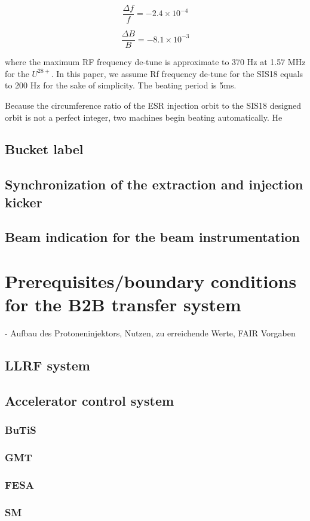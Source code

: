\begin{equation}
\frac{\Delta{f}}{f} = -{2.4}{\times}10^{-4}
\label{eq6}
\end{equation}

\begin{equation}\frac{\Delta{B}}{B} = -{8.1}{\times}10^{-3}\label{eq5}
\end{equation}

where the maximum RF frequency de-tune is approximate to 370 Hz at 1.57 MHz for the $U^{28+}$. In this paper, we assume Rf frequency de-tune for the SIS18 equals to 200 Hz for the sake of simplicity. The beating period is 5ms.


Because the circumference ratio of the ESR injection orbit to the SIS18 designed orbit is not a perfect integer, two machines begin beating automatically. He 


\subsection{Bucket label}
\subsection{Synchronization of the extraction and injection kicker}
\subsection{Beam indication for the beam instrumentation}


\section{Prerequisites/boundary conditions for the B2B transfer system}
- Aufbau des Protoneninjektors, Nutzen, zu erreichende Werte, FAIR Vorgaben
\subsection{LLRF system}
\subsection{Accelerator control system}
\subsubsection{BuTiS}
\subsubsection{GMT}
\subsubsection{FESA}
\subsubsection{SM}


